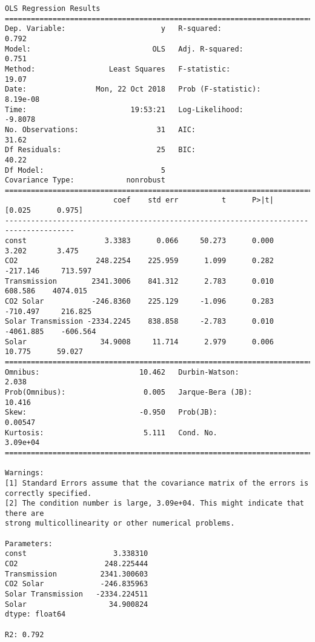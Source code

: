 \documentclass[11pt]{article}
\begin{document}
    \begin{Verbatim}[commandchars=\\\{\}]
                            OLS Regression Results                            
==============================================================================
Dep. Variable:                      y   R-squared:                       0.792
Model:                            OLS   Adj. R-squared:                  0.751
Method:                 Least Squares   F-statistic:                     19.07
Date:                Mon, 22 Oct 2018   Prob (F-statistic):           8.19e-08
Time:                        19:53:21   Log-Likelihood:                -9.8078
No. Observations:                  31   AIC:                             31.62
Df Residuals:                      25   BIC:                             40.22
Df Model:                           5                                         
Covariance Type:            nonrobust                                         
======================================================================================
                         coef    std err          t      P>|t|      [0.025      0.975]
--------------------------------------------------------------------------------------
const                  3.3383      0.066     50.273      0.000       3.202       3.475
CO2                  248.2254    225.959      1.099      0.282    -217.146     713.597
Transmission        2341.3006    841.312      2.783      0.010     608.586    4074.015
CO2 Solar           -246.8360    225.129     -1.096      0.283    -710.497     216.825
Solar Transmission -2334.2245    838.858     -2.783      0.010   -4061.885    -606.564
Solar                 34.9008     11.714      2.979      0.006      10.775      59.027
==============================================================================
Omnibus:                       10.462   Durbin-Watson:                   2.038
Prob(Omnibus):                  0.005   Jarque-Bera (JB):               10.416
Skew:                          -0.950   Prob(JB):                      0.00547
Kurtosis:                       5.111   Cond. No.                     3.09e+04
==============================================================================

Warnings:
[1] Standard Errors assume that the covariance matrix of the errors is correctly specified.
[2] The condition number is large, 3.09e+04. This might indicate that there are
strong multicollinearity or other numerical problems. 

Parameters: 
const                    3.338310
CO2                    248.225444
Transmission          2341.300603
CO2 Solar             -246.835963
Solar Transmission   -2334.224511
Solar                   34.900824
dtype: float64 

R2: 0.792

    \end{Verbatim}
\end{document}
